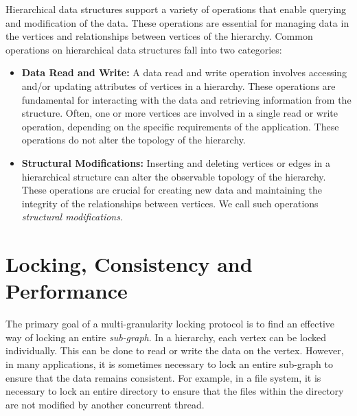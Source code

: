 Hierarchical data structures support a variety of operations that enable querying and modification of the data. These operations are essential for managing data in the vertices and relationships between vertices of the hierarchy. Common operations on hierarchical data structures fall into two categories:

\begin{itemize}

    
    \item \textbf{Data Read and Write:} A data read and write operation involves accessing and/or updating attributes of vertices in a hierarchy. These operations are fundamental for interacting with the data and retrieving information from the structure. Often, one or more vertices are involved in a single read or write operation, depending on the specific requirements of the application. These operations do not alter the topology of the hierarchy.

    \item \textbf{Structural Modifications:} Inserting and deleting vertices or edges in a hierarchical structure can alter the observable topology of the hierarchy. These operations are crucial for creating new data and maintaining the integrity of the relationships between vertices. We call such operations \emph{structural modifications}.
    

\end{itemize}

\section{Locking, Consistency and Performance}
The primary goal of a multi-granularity locking protocol is to find an effective way of locking an entire \emph{sub-graph}. In a hierarchy, each vertex can be locked individually. This can be done to read or write the data on the vertex. However, in many applications, it is sometimes necessary to lock an entire sub-graph to ensure that the data remains consistent. For example, in a file system, it is necessary to lock an entire directory to ensure that the files within the directory are not modified by another concurrent thread.


